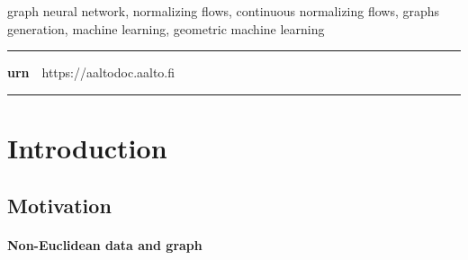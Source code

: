 \begin{spacing}{.88}
	{\parindent0pt %

	\parbox[t]{123.6mm}{\raggedright\small graph neural network, normalizing flows, continuous normalizing flows, graphs generation, machine learning, geometric machine learning}

	\vspace{.5mm}\rule{\textwidth}{.75pt}

	{\fontsize{10.5pt}{10.5pt}\bfseries\sffamily\lsstyle urn}~~{\small https://aaltodoc.aalto.fi}

	\vspace{-2.4mm}\rule{\textwidth}{.75pt}

	} %
\end{spacing}




\newpage

\tableofcontents


\newpage


\chapter*{Introduction}

\section{Motivation}

\subsubsection{Non-Euclidean data and graph}

